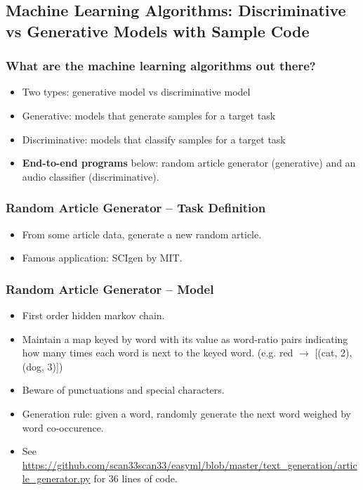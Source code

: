\documentclass{beamer}
\begin{document}
\subsection{Machine Learning Algorithms: Discriminative vs Generative Models with Sample Code}
\begin{frame}
  \frametitle{What are the machine learning algorithms out there?}
  \begin{itemize}
    \item Two types: generative model vs discriminative model
    \pause
    \item Generative: models that generate samples for a target task
    \item Discriminative: models that classify samples for a target task
    \pause
    \item {\bf End-to-end programs} below: random article generator (generative) and an audio classifier (discriminative).
  \end{itemize}
\end{frame}

\begin{frame}
  \frametitle{Random Article Generator -- Task Definition}
  \begin{itemize}
    \item From some article data, generate a new random article.
    \item Famous application: SCIgen by MIT.
  \end{itemize}
\end{frame} 

\begin{frame}
  \frametitle{Random Article Generator -- Model}
  \begin{itemize}
    \item First order hidden markov chain.
    \item Maintain a map keyed by word with its value as word-ratio pairs indicating how many times each word is next to the keyed word. (e.g. red $\to$ [(cat, 2), (dog, 3)])
    \item Beware of punctuations and special characters.
    \item Generation rule: given a word, randomly generate the next word weighed by word co-occurence.
    \item See {\scriptsize \url{https://github.com/scan33scan33/easyml/blob/master/text_generation/article_generator.py}} for 36 lines of code.
  \end{itemize}
\end{frame} 
\end{document}

